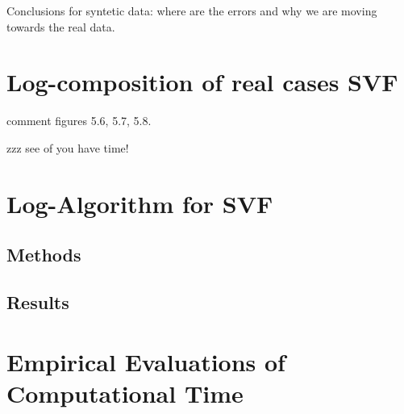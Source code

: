 Conclusions for syntetic data: where are the errors and why we are moving towards the real data.




\newpage

\section{Log-composition of real cases SVF}


comment figures 5.6, 5.7, 5.8.



zzz see of you have time!


\newpage

\section{Log-Algorithm for SVF}

\subsection{Methods}

\subsection{Results}


\section{Empirical Evaluations of Computational Time}

\newpage
